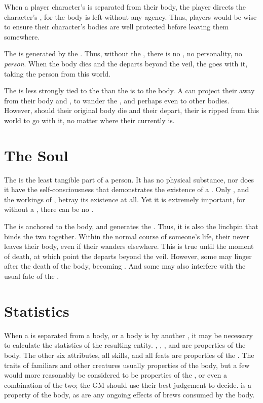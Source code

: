 When a player character's {\mind} is separated from their body, the player directs the character's {\mind}, for the body is left without any agency.
Thus, players would be wise to ensure their character's bodies are well protected before leaving them somewhere.


The {\mind} is generated by the {\soul}.
Thus, without the {\soul}, there is no {\mind}, no personality, no \emph{person}.
When the body dies and the {\soul} departs beyond the veil, the {\mind} goes with it, taking the person from this world.

The {\mind} is less strongly tied to the {\soul} than the {\soul} is to the body.
A  can project their {\mind} away from their body and {\soul}, to wander the {\mentalrealm}, and perhaps even to {\possess} other bodies.
However, should their original body die and their {\soul} depart, their {\mind} is ripped from this world to go with it, no matter where their {\mind} currently is.

\section{The Soul}

The {\soul} is the least tangible part of a person.
It has no physical substance, nor does it have the self-consciousness that demonstrates the existence of a {\mind}.
Only {\ghosts}, and the workings of , betray its existence at all.
Yet it is extremely important, for without a {\soul}, there can be no {\mind}.

The {\soul} is anchored to the body, and generates the {\mind}.
Thus, it is also the linchpin that binds the two together.
Within the normal course of someone's life, their {\soul} never leaves their body, even if their {\mind} wanders elsewhere.
This is true until the moment of death, at which point the {\soul} departs beyond the veil.
However, some {\souls} may linger after the death of the body, becoming {\ghosts}.
And some  may also interfere with the usual fate of the {\soul}.

\section{Statistics}

When a {\mind} is separated from a body, or a body is {\possessed} by another {\mind}, it may be necessary to calculate the statistics of the resulting entity.
, , , and  are properties of the body.
The other six attributes, all skills, and all feats are properties of the {\mind}.
The traits of familiars and other creatures usually properties of the body, but a few would more reasonably be considered to be properties of the {\mind}, or even a combination of the two; the GM should use their best judgement to decide.
\capital{\damage} is a property of the body, as are any ongoing effects of brews consumed by the body.

